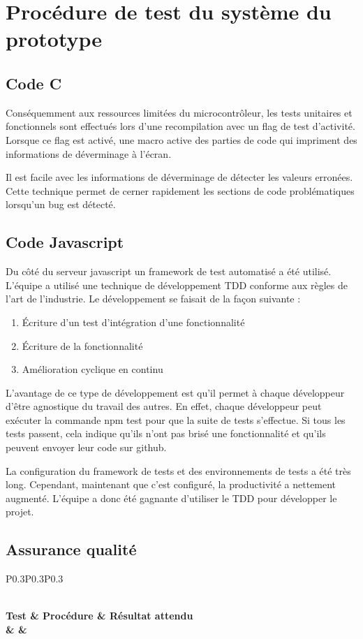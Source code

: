 \section{Procédure de test du système du prototype}
	\subsection{Code C}
	Conséquemment aux ressources limitées du microcontrôleur, les tests unitaires et fonctionnels sont effectués lors d’une recompilation avec un \og flag\fg{} de test d'activité. Lorsque ce \og flag\fg{} est activé, une macro active des parties de code qui impriment des informations de déverminage à l’écran.

	Il est facile avec les informations de déverminage de détecter les valeurs erronées. Cette technique permet de cerner rapidement les sections de code problématiques lorsqu’un bug est détecté.

	\subsection{Code Javascript}
	Du côté du serveur javascript un \og framework\fg{} de test automatisé a été utilisé. L’équipe a utilisé une technique de développement TDD conforme aux règles de l’art de l’industrie. Le développement se faisait de la façon suivante : 
	\begin{enumerate}
		\item Écriture d’un test d’intégration d’une fonctionnalité
		\item Écriture de la fonctionnalité
		\item Amélioration cyclique en continu
	\end{enumerate}%
	
	L’avantage de ce type de développement est qu’il permet à chaque développeur d’être agnostique du travail des autres. En effet, chaque développeur peut exécuter la commande \og npm test \fg{} pour que la suite de tests s’effectue. Si tous les tests passent, cela indique qu’ils n’ont pas brisé une fonctionnalité et qu’ils peuvent envoyer leur code sur github.

	La configuration du \og framework\fg{} de tests et des environnements de tests a été très long. Cependant, maintenant que c’est configuré, la productivité a nettement augmenté. L’équipe a donc été gagnante d’utiliser le TDD pour développer le projet.
		
	\subsection{Assurance qualité}
	\begin{longtable}[c]{P{0.3\textwidth}P{0.3\textwidth}P{0.3\textwidth}}
		\caption{Plan de test du prototype} \\
		\hline
		\bf Test & \bf Procédure & \bf Résultat attendu \\
		\hline
		\hline
		{\Test & \Procedure & \ResultatAttendu}
		\\\hline
	\end{longtable}
